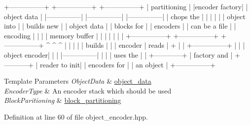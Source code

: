 \begin{DoxyPre}
+---------------+     +---------------+     +---------------+
| partitioning  |     |encoder factory|     |  object data  |
|---------------|     |---------------|     |---------------|
| chops the     |     |               |     |               |
| object into   |     | builds new    |     | object data   |
| blocks for    |     | encoders      |     | can be a file |
| encoding      |     |               |     | memory buffer |
|               |     |               |     |               |
+---------------+     +---------------+     +---------------+
       ^                      ^                     ^
       |                      |                     |
       |                      | builds              |
       |                      | encoder             | reads
       |                      +                     |
       |              +---------------+             |
       |              | object encoder|             |
       |              |---------------|             |
       |              | uses the      |             |
       +------------+ | factory and   | +-----------+
                      | reader to init|
                      | encoders for  |
                      | an object     |
                      +---------------+
\end{DoxyPre}



\begin{DoxyTemplParams}{Template Parameters}
{\em Object\-Data} & \hyperlink{classobject__data}{object\-\_\-data} \\
\hline
{\em Encoder\-Type} & An encoder stack which should be used \\
\hline
{\em Block\-Paritioning} & \hyperlink{classblock__partitioning}{block\-\_\-partitioning} \\
\hline
\end{DoxyTemplParams}


Definition at line 60 of file object\-\_\-encoder.\-hpp.



